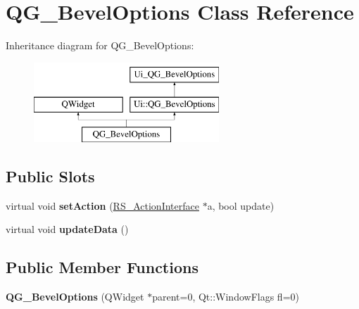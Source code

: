 \hypertarget{classQG__BevelOptions}{\section{Q\-G\-\_\-\-Bevel\-Options Class Reference}
\label{classQG__BevelOptions}
}
Inheritance diagram for Q\-G\-\_\-\-Bevel\-Options\-:\begin{figure}[H]
\begin{center}
\leavevmode
\includegraphics[height=3.000000cm]{classQG__BevelOptions}
\end{center}
\end{figure}
\subsection*{Public Slots}
\begin{DoxyCompactItemize}
\item 
\hypertarget{classQG__BevelOptions_ae16070ece924b9973c6d40d8efaf1b35}{virtual void {\bfseries set\-Action} (\hyperlink{classRS__ActionInterface}{R\-S\-\_\-\-Action\-Interface} $\ast$a, bool update)}\label{classQG__BevelOptions_ae16070ece924b9973c6d40d8efaf1b35}

\item 
\hypertarget{classQG__BevelOptions_af33efc862bc235eeae1b2b79a5be92b1}{virtual void {\bfseries update\-Data} ()}\label{classQG__BevelOptions_af33efc862bc235eeae1b2b79a5be92b1}

\end{DoxyCompactItemize}
\subsection*{Public Member Functions}
\begin{DoxyCompactItemize}
\item 
\hypertarget{classQG__BevelOptions_a3ead1e1fcbb3f8fb0ef0e8f516edbeff}{{\bfseries Q\-G\-\_\-\-Bevel\-Options} (Q\-Widget $\ast$parent=0, Qt\-::\-Window\-Flags fl=0)}\label{classQG__BevelOptions_a3ead1e1fcbb3f8fb0ef0e8f516edbeff}

\end{DoxyCompactItemize}

